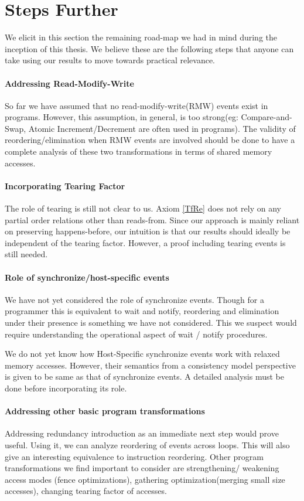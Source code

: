 \section{Steps Further}

    We elicit in this section the remaining road-map we had in mind during the inception of this thesis. 
    We believe these are the following steps that anyone can take using our results to move towards practical relevance.

    \paragraph{Addressing Read-Modify-Write}
        So far we have assumed that no read-modify-write(RMW) events exist in programs.
        However, this assumption, in general, is too strong(eg: Compare-and-Swap, Atomic Increment/Decrement are often used in programs).
        The validity of reordering/elimination when RMW events are involved should be done to have a complete analysis of these two transformations in terms of shared memory accesses.

    \paragraph{Incorporating Tearing Factor}
        The role of tearing is still not clear to us.
        Axiom \ref{TfRe} does not rely on any partial order relations other than reads-from. 
        Since our approach is mainly reliant on preserving happens-before, our intuition is that our results should ideally be independent of the tearing factor.
        However, a proof including tearing events is still needed.   
  
    \paragraph{Role of synchronize/host-specific events}
        We have not yet considered the role of synchronize events. 
        Though for a programmer this is equivalent to wait and notify, reordering and elimination under their presence is something we have not considered. 
        This we suspect would require understanding the operational aspect of wait / notify procedures.

        We do not yet know how Host-Specific synchronize events work with relaxed memory accesses.
        However, their semantics from a consistency model perspective is given to be same as that of synchronize events. 
        A detailed analysis must be done before incorporating its role. 
    
    \paragraph{Addressing other basic program transformations}
        Addressing redundancy introduction as an immediate next step would prove useful.
        Using it, we can analyze reordering of events across loops. 
        This will also give an interesting equivalence to instruction reordering. 
        Other program transformations we find important to consider are strengthening/ weakening access modes (fence optimizations), gathering optimization(merging small size accesses), changing tearing factor of accesses. 